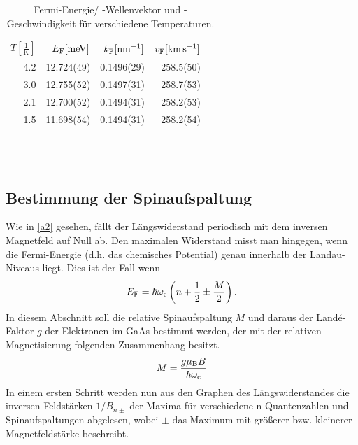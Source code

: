 \documentclass[paper=a4,fontsize=10pt,DIV=18,twocolumn,parskip=half]{scrartcl}
\numberwithin{equation}{section}    %
\newcommand{\kor}[1]{{\color{darkgreen}#1}}
\begin{document}
\begin{table}[htp]
	\begin{center}
		\kor{
		\begin{tabular}{rrrrr}			
			\hline
			$T[\frac{1}{\mathrm{K}}]$ & $E_{\rm F}[\mathrm{meV}]$ & $k_{\rm F}[\SI{}{\per\nano\meter}]$ & $v_{\rm F}[\SI{}{\kilo\meter\per\second}]$\\
			\hline
			4.2 &12.724(49)	&0.1496(29)&	258.5(50)\\
			3.0 &12.755(52)	&0.1497(31)&	258.7(53)\\
			2.1 &12.700(52)	&0.1494(31)&	258.2(53)\\
			1.5 &11.698(54)	&0.1494(31)&	258.2(54)\\
			
			\hline
		\end{tabular}
		\caption{Fermi-Energie/ -Wellenvektor und -Geschwindigkeit für verschiedene Temperaturen.}
		\label{fermitabelle}
		}
	\end{center}
\end{table}
%
~~~~~~~~~~~~~~~~~~~~~~~~~~~~~~~~~~~~~~~~~~~~~~~~~~~~~~~~~~~~~~~~~~~~~~~~~~~~~
\subsection{Bestimmung der Spinaufspaltung}
\label{a6}
Wie in \ref{a2} gesehen, fällt der Längswiderstand periodisch mit dem inversen Magnetfeld auf Null ab. Den maximalen Widerstand misst man hingegen, wenn die Fermi-Energie (d.h. das chemisches Potential) genau innerhalb der Landau-Niveaus liegt. Dies ist der Fall wenn
\begin{equation}
E_{\rm F}=\hbar \omega_{\rm c}\left( n+\frac{1}{2}\pm\frac{M}{2}\right).
\end{equation}
In diesem Abschnitt soll die relative Spinaufspaltung $M$ und daraus der Landé-Faktor $g$ der Elektronen im GaAs bestimmt werden, der mit der relativen Magnetisierung folgenden Zusammenhang besitzt.
\begin{equation}
M=\frac{g \mu_{\rm B} B}{\hbar \omega_{\rm c}}
\label{lande}
\end{equation}
In einem ersten Schritt werden nun aus den Graphen des Längswiderstandes die inversen Feldstärken $1/B_{n\pm}$ der Maxima für verschiedene n-Quantenzahlen und Spinaufspaltungen abgelesen, wobei $\pm$ das Maximum mit größerer bzw. kleinerer Magnetfeldstärke beschreibt.
\end{document}
